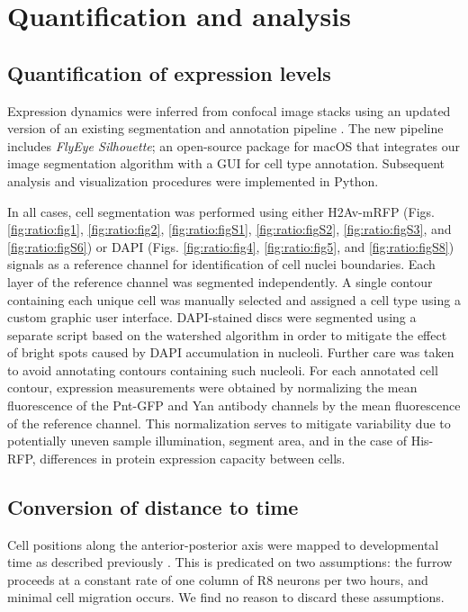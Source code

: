 \section{Quantification and analysis}

\subsection{Quantification of expression levels}
\label{appendix:methods:ratio:quantification}

Expression dynamics were inferred from confocal image stacks using an updated version of an existing segmentation and annotation pipeline \cite{Pelaez2015a}. The new pipeline includes \textit{FlyEye Silhouette}; an open-source package for macOS that integrates our image segmentation algorithm with a GUI for cell type annotation. Subsequent analysis and visualization procedures were implemented in Python.

In all cases, cell segmentation was performed using either H2Av-mRFP (Figs. \ref{fig:ratio:fig1}, \ref{fig:ratio:fig2}, \ref{fig:ratio:figS1}, \ref{fig:ratio:figS2}, \ref{fig:ratio:figS3}, and \ref{fig:ratio:figS6}) or DAPI (Figs. \ref{fig:ratio:fig4}, \ref{fig:ratio:fig5}, and \ref{fig:ratio:figS8}) signals as a reference channel for identification of cell nuclei boundaries. Each layer of the reference channel was segmented independently. A single contour containing each unique cell was manually selected and assigned a cell type using a custom graphic user interface. DAPI-stained discs were segmented using a separate script based on the watershed algorithm in order to mitigate the effect of bright spots caused by DAPI accumulation in nucleoli. Further care was taken to avoid annotating contours containing such nucleoli. For each annotated cell contour, expression measurements were obtained by normalizing the mean fluorescence of the Pnt-GFP and Yan antibody channels by the mean fluorescence of the reference channel. This normalization serves to mitigate variability due to potentially uneven sample illumination, segment area, and in the case of His-RFP, differences in protein expression capacity between cells.

\subsection{Conversion of distance to time}
\label{appendix:methods:ratio:distance_to_time}

Cell positions along the anterior-posterior axis were mapped to developmental time as described previously \cite{Pelaez2015a,Pelaez2016}. This is predicated on two assumptions: the furrow proceeds at a constant rate of one column of R8 neurons per two hours, and minimal cell migration occurs. We find no reason to discard these assumptions.

